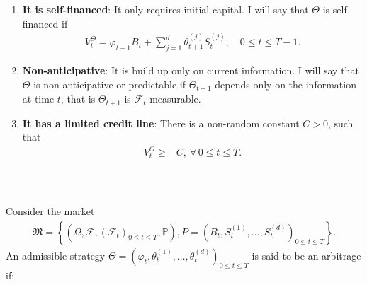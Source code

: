 \documentclass{beamer}
\numberwithin{equation}{section}
\begin{document}
\begin{frame}\frametitle{{\normalsize \secname} \\ {\large \subsecname}}
    \begin{enumerate}
        \item \textbf{It is self-financed}: It only requires initial capital.
        I will say that $\Theta$ is self financed if
        \begin{align}
            V_t^{\Theta} = \varphi_{t+1}B_t + \sum_{j=1}^d \theta_{t+1}^{(j)}S_t^{(j)}, \quad 0 \leq t \leq T-1.
        \end{align}
        \item \textbf{Non-anticipative}: It is build up only on current information.
        I will say that $\Theta$ is non-anticipative or predictable if $\Theta_{t+1}$ depends only on the information at time $t$, that is $\Theta_{t+1}$ is $\mathscr{F}_t$-measurable.
        \item \textbf{It has a limited credit line}: There is a non-random constant $C > 0$, such that
        \begin{align}
            V_t^{\Theta} \geq -C, \ \forall \, 0 \leq t \leq T.
        \end{align}
    \end{enumerate}
\end{frame}

\begin{frame}\frametitle{{\normalsize \secname} \\ {\large \subsecname}}
    \begin{definition}[Arbitrage]
        Consider the market
        \begin{align}
            \mathfrak{M} =
            \left\{
                \left(
                    \Omega,
                    \mathscr{F},
                    \left(
                        \mathscr{F}_t
                    \right)_{0 \leq t \leq T},
                    \mathbb{P}
                \right),
                P =
                \left(
                    B_t,
                    S_t^{(1)},
                    \ldots,
                    S_t^{(d)}
                \right)_{0 \leq t \leq T}
            \right\}.
        \end{align}
        An admissible strategy $\Theta = \left(\varphi_t, \theta_t^{(1)}, \ldots, \theta_t^{(d)}\right)_{0 \leq t \leq T}$ is said to be an arbitrage if:
    \end{definition}
\end{frame}
\end{document}
